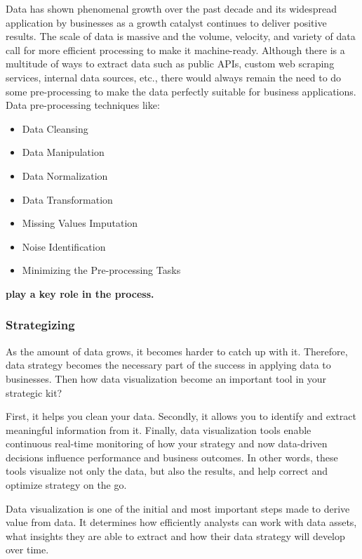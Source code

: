 \documentclass[]{book}
\providecommand{\tightlist}{%
  \setlength{\itemsep}{0pt}\setlength{\parskip}{0pt}}
\begin{document}
Data has shown phenomenal growth over the past decade and its widespread application by businesses as a growth catalyst continues to deliver positive results. The scale of data is massive and the volume, velocity, and variety of data call for more efficient processing to make it machine-ready. Although there is a multitude of ways to extract data such as public APIs, custom web scraping services, internal data sources, etc., there would always remain the need to do some pre-processing to make the data perfectly suitable for business applications. Data pre-processing techniques like:

\begin{itemize}
\tightlist
\item
  Data Cleansing
\item
  Data Manipulation
\item
  Data Normalization
\item
  Data Transformation
\item
  Missing Values Imputation
\item
  Noise Identification
\item
  Minimizing the Pre-processing Tasks
\end{itemize}

\textbf{play a key role in the process.}

\hypertarget{strategizing}{%
\subsubsection{Strategizing}\label{strategizing}}

As the amount of data grows, it becomes harder to catch up with it. Therefore, data strategy becomes the necessary part of the success in applying data to businesses. Then how data visualization become an important tool in your strategic kit?

First, it helps you clean your data. Secondly, it allows you to identify and extract meaningful information from it. Finally, data visualization tools enable continuous real-time monitoring of how your strategy and now data-driven decisions influence performance and business outcomes. In other words, these tools visualize not only the data, but also the results, and help correct and optimize strategy on the go.

Data visualization is one of the initial and most important steps made to derive value from data. It determines how efficiently analysts can work with data assets, what insights they are able to extract and how their data strategy will develop over time.
\end{document}
